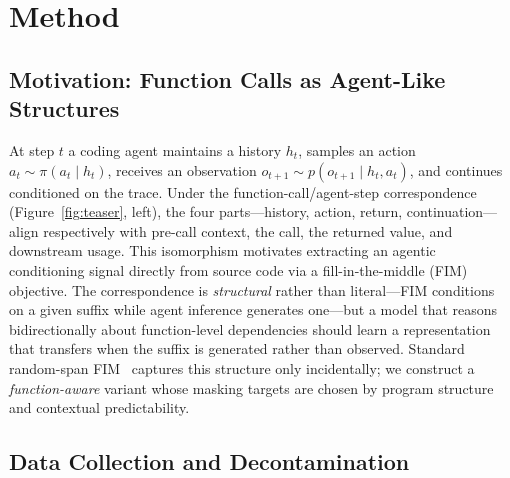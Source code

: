 
\section{Method}
\label{sec:method}
\vspace{-0.5ex}

\subsection{Motivation: Function Calls as Agent-Like Structures}
\label{sec:method:motivation}

At step $t$ a coding agent maintains a history $h_t$, samples an action
$a_t \sim \pi(a_t \mid h_t)$, receives an observation
$o_{t+1} \sim p(o_{t+1} \mid h_t, a_t)$, and continues conditioned on the
trace. Under the function-call/agent-step correspondence
(Figure~\ref{fig:teaser}, left), the four parts---history, action, return,
continuation---align respectively with pre-call context, the call,
the returned value, and downstream usage. This isomorphism motivates
extracting an agentic conditioning signal directly from source code via a
fill-in-the-middle (FIM) objective. The correspondence is
\emph{structural} rather than literal---FIM conditions on a given suffix
while agent inference generates one---but a model that reasons
bidirectionally about function-level dependencies should learn a
representation that transfers when the suffix is generated rather than
observed. Standard random-span FIM~\citep{qwencoder, deepseekcoder,
starcoder} captures this structure only incidentally; we construct a
\emph{function-aware} variant whose masking targets are chosen by program
structure and contextual predictability.

\vspace{-0.5ex}
\subsection{Data Collection and Decontamination}
\label{sec:method:data}

